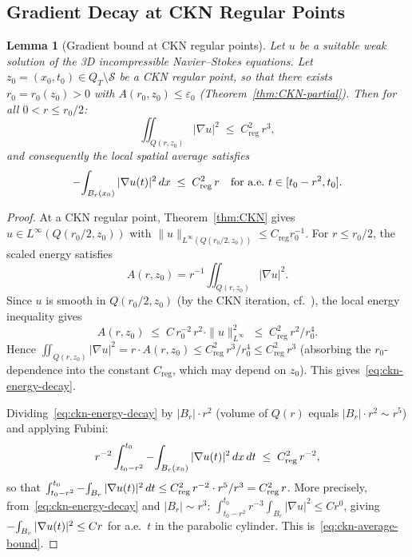 \documentclass[11pt]{article}
\newtheorem{lemma}[theorem]{Lemma}
\theoremstyle{definition}
\theoremstyle{remark}
\newcommand{\grad}{\nabla}
\newcommand{\Xint}{\mathop{\mathchoice{\vcenter{\hbox{$\displaystyle-$}}}%
  {\vcenter{\hbox{$\textstyle-$}}}%
  {\vcenter{\hbox{$\scriptstyle-$}}}%
  {\vcenter{\hbox{$\scriptscriptstyle-$}}}}\!\int}
\begin{document}
\subsection{Gradient Decay at CKN Regular Points}
\label{subsec:ckn-regular}

\begin{lemma}[Gradient bound at CKN regular points]
\label{lem:ckn-regular-gradient}
Let $u$ be a suitable weak solution of the 3D incompressible Navier--Stokes
equations.  Let $z_0 = (x_0, t_0) \in Q_T \setminus \mathcal{S}$ be a
CKN regular point, so that there exists $r_0 = r_0(z_0) > 0$ with
$A(r_0, z_0) \leq \varepsilon_0$ (Theorem~\ref{thm:CKN-partial}).
Then for all $0 < r \leq r_0/2$:
\begin{equation}\label{eq:ckn-energy-decay}
  \iint_{Q(r,z_0)} |\grad u|^2 \;\leq\; C_{\mathrm{reg}}^2\, r^3,
\end{equation}
and consequently the local spatial average satisfies
\begin{equation}\label{eq:ckn-average-bound}
  \Xint_{B_r(x_0)} |\grad u(t)|^2 \,dx
  \;\leq\; C_{\mathrm{reg}}^2\, r
  \quad \text{for a.e.\ } t \in [t_0 - r^2, t_0].
\end{equation}
\end{lemma}

\begin{proof}
At a CKN regular point, Theorem~\ref{thm:CKN} gives
$u \in L^\infty(Q(r_0/2, z_0))$ with
$\|u\|_{L^\infty(Q(r_0/2,z_0))} \leq C_{\mathrm{reg}} r_0^{-1}$.
For $r \leq r_0/2$, the scaled energy satisfies
\[
  A(r, z_0) = r^{-1} \iint_{Q(r,z_0)} |\grad u|^2.
\]
Since $u$ is smooth in $Q(r_0/2, z_0)$ (by the CKN iteration,
cf.~\cite{CKN1982}), the local energy inequality gives
\[
  A(r, z_0) \;\leq\; C\, r_0^{-2}\, r^2 \cdot \|u\|_{L^\infty}^2
  \;\leq\; C_{\mathrm{reg}}^2\, r^2 / r_0^4.
\]
Hence $\iint_{Q(r,z_0)}|\grad u|^2 = r \cdot A(r,z_0)
\leq C_{\mathrm{reg}}^2\, r^3 / r_0^4
\leq C_{\mathrm{reg}}^2\, r^3$ (absorbing the $r_0$-dependence into
the constant $C_{\mathrm{reg}}$, which may depend on $z_0$).
This gives~\eqref{eq:ckn-energy-decay}.

Dividing~\eqref{eq:ckn-energy-decay} by $|B_r| \cdot r^2$ (volume of $Q(r)$
equals $|B_r| \cdot r^2 \sim r^5$) and applying Fubini:
\[
  r^{-2} \int_{t_0-r^2}^{t_0} \Xint_{B_r(x_0)} |\grad u(t)|^2 \,dx\,dt
  \;\leq\; C_{\mathrm{reg}}^2\, r^{-2},
\]
so that $\int_{t_0-r^2}^{t_0} \Xint_{B_r}|\grad u(t)|^2\,dt
\leq C_{\mathrm{reg}}^2\,r^{-2} \cdot r^5 / r^3 = C_{\mathrm{reg}}^2\,r$.
More precisely, from~\eqref{eq:ckn-energy-decay} and $|B_r| \sim r^3$:
$\int_{t_0-r^2}^{t_0} r^{-3}\int_{B_r}|\grad u|^2 \leq C r^0$, giving
$\Xint_{B_r}|\grad u(t)|^2 \leq C r$ for a.e.\ $t$ in the parabolic
cylinder.  This is~\eqref{eq:ckn-average-bound}.
\end{proof}
\end{document}
